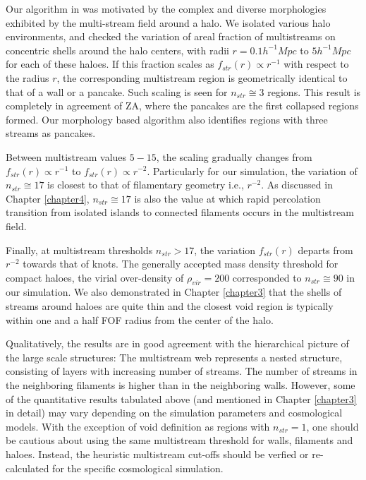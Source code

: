 Our algorithm in \cite{Ramachandra2015} was motivated by the complex and diverse morphologies exhibited by the multi-stream field around a halo. We isolated various halo environments, and checked the variation of areal fraction of multistreams on concentric shells around the halo centers, with radii $r = 0.1 h^{-1} Mpc$ to $5 h^{-1} Mpc$ for each of these haloes. If this fraction scales as $f_{str}(r) \propto r^{-1}$ with respect to the radius $r$, the corresponding multistream region is geometrically identical to that of a wall or a pancake. Such scaling is seen for $n_{str} \cong 3$ regions. This result is completely in agreement of ZA, where the pancakes are the first collapsed regions formed. Our morphology based algorithm also identifies regions with three streams as pancakes.  

Between multistream values $5-15$, the scaling gradually changes from $f_{str}(r) \propto r^{-1}$ to $f_{str}(r) \propto r^{-2}$. Particularly for our simulation, the variation of $n_{str} \cong 17$ is closest to that of filamentary geometry i.e., $r^{-2}$. As discussed in Chapter \ref{chapter4}, $n_{str} \cong 17$ is also the value at which rapid percolation transition from isolated islands to connected filaments occurs in the multistream field. 

Finally, at multistream thresholds $n_{str} > 17$, the variation $f_{str}(r)$ departs from $r^{-2}$ towards that of knots. The generally accepted mass density threshold for compact haloes, the virial over-density of $\rho_{vir} = 200$ corresponded to $n_{str} \cong 90 $ in our simulation. We also demonstrated in Chapter \ref{chapter3} that the shells of streams around haloes are quite thin and the closest void region is typically within one and a half FOF radius from the center of the halo. 

Qualitatively, the results are in good agreement with the hierarchical picture of the large scale structures: The multistream web represents a nested structure, consisting of layers with increasing number of streams. The number of streams in the neighboring filaments is higher than in the neighboring walls. However, some of the quantitative results tabulated above (and mentioned in Chapter \ref{chapter3} in detail) may vary depending on the simulation parameters and cosmological models. With the exception of void definition as regions with $n_{str} = 1$, one should be cautious about using the same multistream threshold for walls, filaments and haloes. Instead, the heuristic multistream cut-offs should be verfied or re-calculated for the specific cosmological simulation. 


